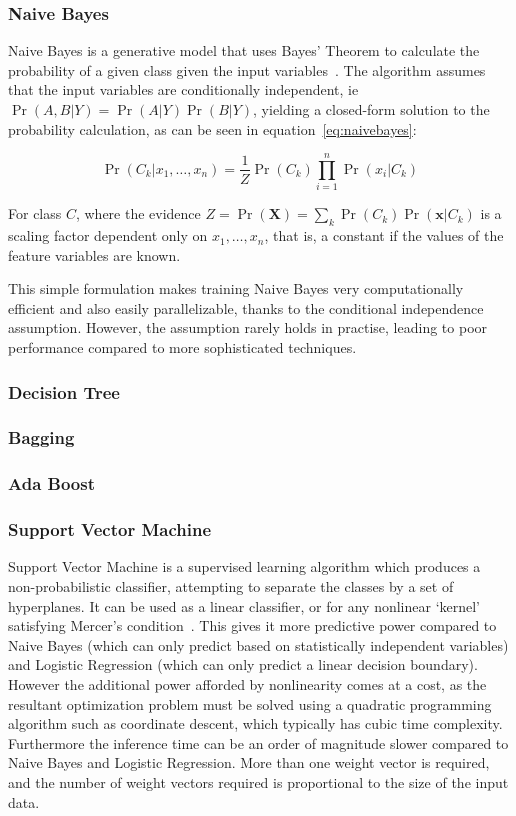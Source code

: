 \documentclass[landscape,twocolumn]{article}
\begin{document}
\subsubsection{Naive Bayes}
Naive Bayes is a generative model that uses Bayes' Theorem to calculate the probability of a given class given the input variables~\cite{rish2001empirical}. The algorithm assumes that the input variables are conditionally independent, ie $\Pr\left(A,B|Y\right)=\Pr\left(A|Y\right)\Pr\left(B|Y\right)$, yielding a closed-form solution to the probability calculation, as can be seen in equation~\ref{eq:naivebayes}:

\begin{equation}
	\label{eq:naivebayes}
	\Pr\left(C_k|x_1,\ldots,x_n\right)=\frac{1}{Z}\Pr\left(C_k\right)\prod_{i=1}^n{\Pr\left(x_i|C_k\right)}
\end{equation}

For class $C$, where the evidence $Z=\Pr\left(\textbf{X}\right)=\sum_k{\Pr\left(C_k\right)\Pr\left(\textbf{x}|C_k\right)}$ is a scaling factor dependent only on $x_1,\ldots,x_n$, that is, a constant if the values of the feature variables are known.

This simple formulation makes training Naive Bayes very computationally efficient and also easily parallelizable, thanks to the conditional independence assumption. However, the assumption rarely holds in practise, leading to poor performance compared to more sophisticated techniques.

\subsubsection{Decision Tree}
\subsubsection{Bagging}
\subsubsection{Ada Boost}

\subsubsection{Support Vector Machine}
Support Vector Machine is a supervised learning algorithm which produces a non-probabilistic classifier, attempting to separate the classes by a set of hyperplanes. It can be used as a linear classifier, or for any nonlinear `kernel' satisfying Mercer's condition~\cite{noble2006support}. This gives it more predictive power compared to Naive Bayes (which can only predict based on statistically independent variables) and Logistic Regression (which can only predict a linear decision boundary). However the additional power afforded by nonlinearity comes at a cost, as the resultant optimization problem must be solved using a quadratic programming algorithm such as coordinate descent, which typically has cubic time complexity. Furthermore the inference time can be an order of magnitude slower compared to Naive Bayes and Logistic Regression. More than one weight vector is required, and the number of weight vectors required is proportional to the size of the input data.
\end{document}
